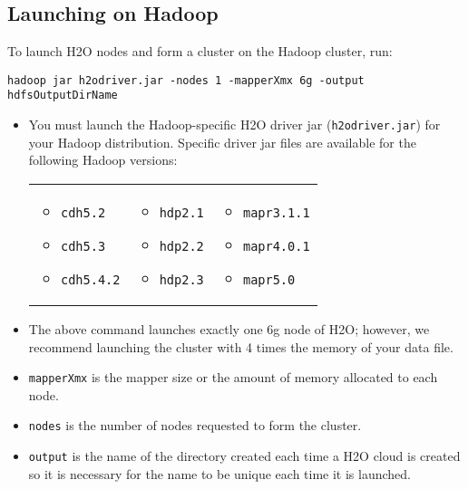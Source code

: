 {{\subsection{Launching on Hadoop}

To launch H2O nodes and form a cluster on the Hadoop cluster, run:

\begin{lstlisting}[style=R]
hadoop jar h2odriver.jar -nodes 1 -mapperXmx 6g -output hdfsOutputDirName

\end{lstlisting}

\begin{itemize}
\item You must launch the Hadoop-specific H2O driver jar (\texttt{h2odriver.jar}) for your Hadoop distribution. Specific driver jar files are available for the following Hadoop versions:

\begin{frame}%

\begin{tabular}{p{3cm}p{3cm}p{3cm}}

\begin{itemize}
     \item \texttt{cdh5.2}
     \item \texttt{cdh5.3}
     \item \texttt{cdh5.4.2}
  \end{itemize} &

\begin{itemize}
  \item \texttt{hdp2.1}
  \item  \texttt{hdp2.2}
  \item  \texttt{hdp2.3}
\end{itemize} &

\begin{itemize}
 \item \texttt{mapr3.1.1}
  \item  \texttt{mapr4.0.1}
  \item  \texttt{mapr5.0}
\end{itemize}\\

\end{tabular}

\end{frame}

\item The above command launches exactly one 6g node of H2O; however,  we recommend launching the cluster with 4 times the memory of your data file.
\item{\texttt{mapperXmx}} is the mapper size or the amount of memory allocated to each node.
\item{\texttt{nodes}} is the number of nodes requested to form the cluster.
\item{\texttt{output}} is the name of the directory created each time a H2O cloud is created so it is necessary for the name to be unique each time it is launched.
\end{itemize}


}}
